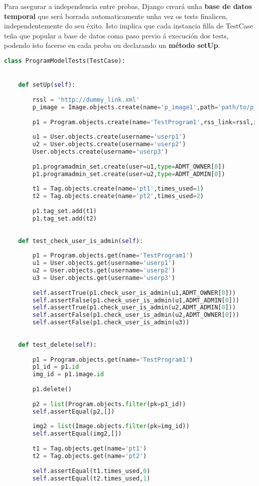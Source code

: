 Para asegurar a independencia entre probas, Django creará unha \textbf{base de datos temporal} que será borrada automaticamente unha vez os tests finalicen, independentemente do seu éxito. Isto implica que cada instancia filla de TestCase teña que popular a base de datos coma paso previo á execución dos tests, podendo isto facerse en cada proba ou declarando un \textbf{método setUp}.


\begin{lstlisting}[language=Python, caption=Probas de unidade dos metodos de Program, label=lst:programtest]
class ProgramModelTests(TestCase): 


	def setUp(self):
	
		rssl = 'http://dummy_link.xml'
		p_image = Image.objects.create(name='p_image1',path='path/to/p_image1')
		
		p1 = Program.objects.create(name='TestProgram1',rss_link=rssl,image=p_image)
		
		u1 = User.objects.create(username='userp1')
		u2 = User.objects.create(username='userp2')
		User.objects.create(username='userp3')
		
		p1.programadmin_set.create(user=u1,type=ADMT_OWNER[0])
		p1.programadmin_set.create(user=u2,type=ADMT_ADMIN[0])
		
		t1 = Tag.objects.create(name='pt1',times_used=1)
		t2 = Tag.objects.create(name='pt2',times_used=2)
		
		p1.tag_set.add(t1)
		p1.tag_set.add(t2)
	
	
	def test_check_user_is_admin(self):
	
		p1 = Program.objects.get(name='TestProgram1')
		u1 = User.objects.get(username='userp1')
		u2 = User.objects.get(username='userp2')
		u3 = User.objects.get(username='userp3')
		
		self.assertTrue(p1.check_user_is_admin(u1,ADMT_OWNER[0]))
		self.assertFalse(p1.check_user_is_admin(u1,ADMT_ADMIN[0]))
		self.assertTrue(p1.check_user_is_admin(u2,ADMT_ADMIN[0]))
		self.assertFalse(p1.check_user_is_admin(u2,ADMT_OWNER[0]))
		self.assertFalse(p1.check_user_is_admin(u3))
	
	
	def test_delete(self):
	
		p1 = Program.objects.get(name='TestProgram1')
		p1_id = p1.id
		img_id = p1.image.id
		
		p1.delete()
		
		p2 = list(Program.objects.filter(pk=p1_id))
		self.assertEqual(p2,[])
		
		img2 = list(Image.objects.filter(pk=img_id))
		self.assertEqual(img2,[])
		
		t1 = Tag.objects.get(name='pt1')
		t2 = Tag.objects.get(name='pt2')
		
		self.assertEqual(t1.times_used,0)
		self.assertEqual(t2.times_used,1)

\end{lstlisting}
 

